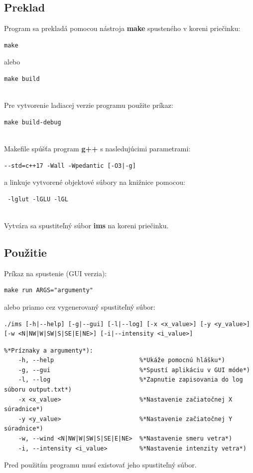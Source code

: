 \documentclass[a4paper,12pt]{article}
\begin{document}
\subsection{Preklad}
Program sa prekladá pomocou nástroja {\bf make} spusteného v koreni priečinku:
\begin{lstlisting}
make
\end{lstlisting}
alebo
\begin{lstlisting}
make build
\end{lstlisting}
\leavevmode\\
Pre vytvorenie ladiacej verzie programu použite príkaz:
\begin{lstlisting}
make build-debug
\end{lstlisting}
\leavevmode\\
Makefile spúšťa program \textbf{g++} s nasledujúcimi parametrami:
\begin{lstlisting}
--std=c++17 -Wall -Wpedantic [-O3|-g]
\end{lstlisting}
a linkuje vytvorené objektové súbory na knižnice pomocou:
\begin{lstlisting}
 -lglut -lGLU -lGL
\end{lstlisting}
\leavevmode\\
Vytvára sa spustiteľný súbor {\bf ims} na koreni priečinku.

\subsection{Použitie}
Príkaz na spustenie (GUI verzia):
\begin{lstlisting}
make run ARGS="argumenty"
\end{lstlisting}
alebo priamo cez vygenerovaný spustiteľný súbor:
\begin{lstlisting}
./ims [-h|--help] [-g|--gui] [-l|--log] [-x <x_value>] [-y <y_value>] [-w <N|NW|W|SW|S|SE|E|NE>] [-i|--intensity <i_value>]
\end{lstlisting}
\begin{lstlisting}
%*Príznaky a argumenty*):
    -h, --help                        %*Ukáže pomocnú hlášku*)
    -g, --gui                         %*Spustí aplikáciu v GUI móde*)
    -l, --log                         %*Zapnutie zapisovania do log súboru output.txt*)
    -x <x_value>                      %*Nastavenie začiatočnej X súradnice*)
    -y <y_value>                      %*Nastavenie začiatočnej Y súradnice*)
    -w, --wind <N|NW|W|SW|S|SE|E|NE>  %*Nastavenie smeru vetra*)
    -i, --intensity <i_value>         %*Nastavenie intenzity vetra*)
\end{lstlisting}
Pred použitím programu musí existovať jeho spustiteľný súbor.
\end{document}

